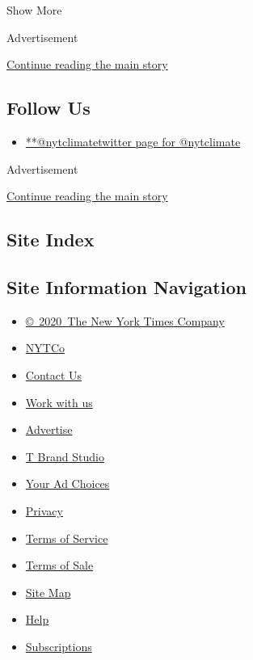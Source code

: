 Show More

Advertisement

\protect\hyperlink{after-mid2}{Continue reading the main story}

\hypertarget{follow-us}{%
\subsection{Follow Us}\label{follow-us}}

\begin{itemize}
\tightlist
\item
  \href{https://twitter.com/nytclimate}{**@nytclimatetwitter page for
  @nytclimate}
\end{itemize}

Advertisement

\protect\hyperlink{after-mktg}{Continue reading the main story}

\hypertarget{site-index}{%
\subsection{Site Index}\label{site-index}}

\hypertarget{site-information-navigation}{%
\subsection{Site Information
Navigation}\label{site-information-navigation}}

\begin{itemize}
\tightlist
\item
  \href{https://help.nytimes.com/hc/en-us/articles/115014792127-Copyright-notice}{©~2020~The
  New York Times Company}
\end{itemize}

\begin{itemize}
\tightlist
\item
  \href{https://www.nytco.com/}{NYTCo}
\item
  \href{https://help.nytimes.com/hc/en-us/articles/115015385887-Contact-Us}{Contact
  Us}
\item
  \href{https://www.nytco.com/careers/}{Work with us}
\item
  \href{https://nytmediakit.com/}{Advertise}
\item
  \href{http://www.tbrandstudio.com/}{T Brand Studio}
\item
  \href{https://www.nytimes.com/privacy/cookie-policy\#how-do-i-manage-trackers}{Your
  Ad Choices}
\item
  \href{https://www.nytimes.com/privacy}{Privacy}
\item
  \href{https://help.nytimes.com/hc/en-us/articles/115014893428-Terms-of-service}{Terms
  of Service}
\item
  \href{https://help.nytimes.com/hc/en-us/articles/115014893968-Terms-of-sale}{Terms
  of Sale}
\item
  \href{https://spiderbites.nytimes.com}{Site Map}
\item
  \href{https://help.nytimes.com/hc/en-us}{Help}
\item
  \href{https://www.nytimes.com/subscription?campaignId=37WXW}{Subscriptions}
\end{itemize}
